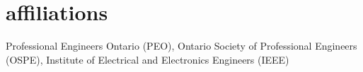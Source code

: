 
\section{affiliations}
  \vspace{-0.2cm}

Professional Engineers Ontario (PEO), Ontario Society of Professional Engineers (OSPE), Institute of Electrical and Electronics Engineers (IEEE)
